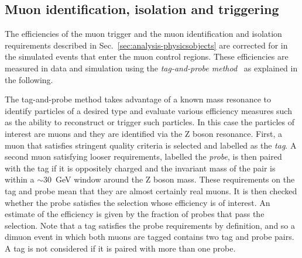 

\subsection{Muon identification, isolation and triggering}
The efficiencies of the muon trigger and the muon identification and isolation 
requirements 
described in Sec.~\ref{sec:analysis-physicsobjects} are corrected for in 
the simulated events that enter the muon control regions. These efficiencies 
are measured in data and simulation using the \textit{tag-and-probe 
method}~\cite{tagnprobe} as explained in the following.

The tag-and-probe method takes advantage of a known mass resonance to identify 
particles of a desired type and evaluate various efficiency measures such as 
the ability to reconstruct or trigger such particles. In this case the 
particles of interest are muons and they are identified via the Z boson 
resonance. 
First, a muon that satisfies stringent quality criteria is selected and 
labelled as the \textit{tag}. A second muon satisfying looser requirements, 
labelled the \textit{probe}, is then paired with the tag if it is oppositely 
charged and the invariant mass of the pair is within a $\sim$30~GeV window 
around the Z boson mass. These requirements on the tag and probe mean that they 
are almost certainly real muons. It is then checked whether the probe satisfies 
the selection whose efficiency is of interest. An estimate of the efficiency is 
given by the fraction of probes that pass the selection. Note that a tag 
satisfies the probe requirements by definition, and so a dimuon event in which 
both muons are tagged contains two tag and probe pairs. A tag is not considered 
if it is paired with more than one probe.

